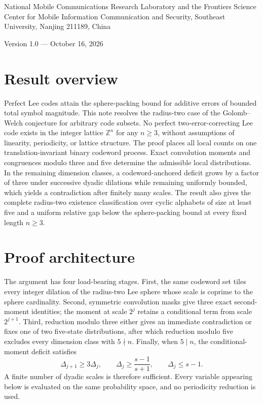 \documentclass[12pt,letterpaper,onecolumn]{article}
\theoremstyle{definition}
\begin{document}
\par\medskip
{}\medskip
{}\par\smallskip
\noindent\begin{minipage}{\linewidth}\small National Mobile Communications Research Laboratory and the Frontiers Science Center for Mobile Information Communication and Security, Southeast University, Nanjing 211189, China\end{minipage}\par\medskip
\noindent Version 1.0 --- October 16, 2026\par\bigskip

\section*{Result overview}
Perfect Lee codes attain the sphere-packing bound for additive errors of bounded total symbol magnitude. This note resolves the radius-two case of the Golomb--Welch conjecture for arbitrary code subsets. No perfect two-error-correcting Lee code exists in the integer lattice $\mathbb Z^n$ for any $n\ge3$, without assumptions of linearity, periodicity, or lattice structure. The proof places all local counts on one translation-invariant binary codeword process. Exact convolution moments and congruences modulo three and five determine the admissible local distributions. In the remaining dimension classes, a codeword-anchored deficit grows by a factor of three under successive dyadic dilations while remaining uniformly bounded, which yields a contradiction after finitely many scales. The result also gives the complete radius-two existence classification over cyclic alphabets of size at least five and a uniform relative gap below the sphere-packing bound at every fixed length $n\ge3$.

\section*{Proof architecture}
The argument has four load-bearing stages. First, the same codeword set tiles every integer dilation of the radius-two Lee sphere whose scale is coprime to the sphere cardinality. Second, symmetric convolution masks give three exact second-moment identities; the moment at scale $2^j$ retains a conditional term from scale $2^{j+1}$. Third, reduction modulo three either gives an immediate contradiction or fixes one of two five-state distributions, after which reduction modulo five excludes every dimension class with $5\nmid n$. Finally, when $5\mid n$, the conditional-moment deficit satisfies
\[
\Delta_{j+1}\ge3\Delta_j,
\qquad
\Delta_j\ge\frac{s-1}{s+1},
\qquad
\Delta_j\le s-1.
\]
A finite number of dyadic scales is therefore sufficient. Every variable appearing below is evaluated on the same probability space, and no periodicity reduction is used.
\end{document}
